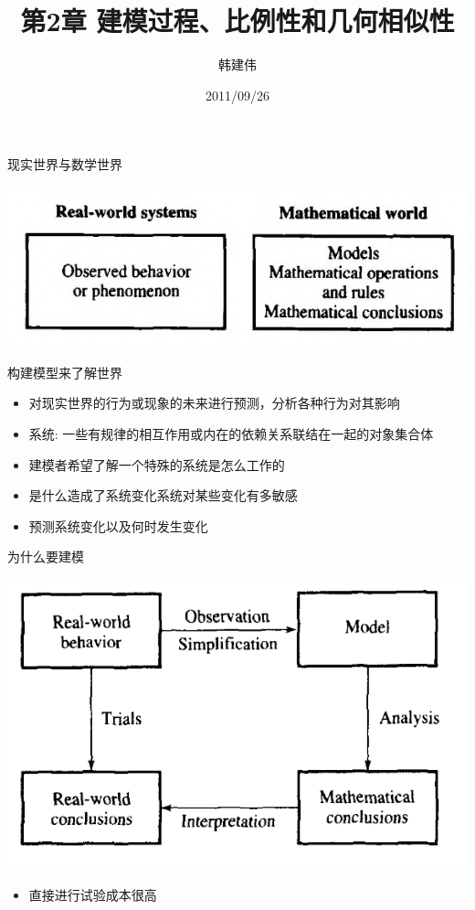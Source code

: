 \documentclass[mathserif]{beamer}
\title{第2章 建模过程、比例性和几何相似性}
\author{韩建伟}
\institute{
  浙江工商大学信息学院\\
  \texttt{hanjianwei@mail.zjgsu.edu.cn}
}
\date{2011/09/26}
\begin{document}
\begin{frame}[plain]
  \titlepage{}
\end{frame}

\begin{frame}{现实世界与数学世界}

  \begin{center}
    \includegraphics[width=.5\textwidth{}]{real_and_math.png}
  \end{center}

  构建模型来了解世界

  \begin{itemize}
  \item 对现实世界的行为或现象的未来进行预测，分析各种行为对其影响
  \item 系统: 一些有规律的相互作用或内在的依赖关系联结在一起的对象集合体
  \item 建模者希望了解一个特殊的系统是怎么工作的
  \item 是什么造成了系统变化系统对某些变化有多敏感
  \item 预测系统变化以及何时发生变化
  \end{itemize}

\end{frame}

\begin{frame}{为什么要建模}
  \begin{center}
    \includegraphics[width=.5\textwidth{}]{whymm.png}
  \end{center}

  \begin{itemize}
  \item 直接进行试验成本很高
  \end{itemize}
\end{frame}
\end{document}
